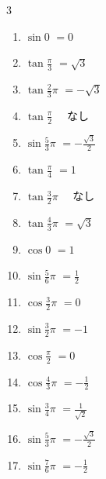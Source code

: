 \begin{multicols}{3}
\begin{enumerate}
  \item $\displaystyle \sin{0}$
        $\displaystyle =0$

  \item $\displaystyle \tan{\frac{\pi}{3}}$
        $\displaystyle =\sqrt{3}$

  \item $\displaystyle \tan{\frac{2}{3}\pi}$
        $\displaystyle =-\sqrt{3}$

  \item $\displaystyle \tan{\frac{\pi}{2}}$
        $\displaystyle \quad なし$

  \item $\displaystyle \sin{\frac{5}{3}\pi}$
        $\displaystyle =-\frac{\sqrt{3}}{2}$

  \item $\displaystyle \tan{\frac{\pi}{4}}$
        $\displaystyle =1$

  \item $\displaystyle \tan{\frac{3}{2}\pi}$
        $\displaystyle \quad なし$

  \item $\displaystyle \tan{\frac{4}{3}\pi}$
        $\displaystyle =\sqrt{3}$

  \item $\displaystyle \cos{0}$
        $\displaystyle =1$

  \item $\displaystyle \sin{\frac{5}{6}\pi}$
        $\displaystyle =\frac{1}{2}$

  \item $\displaystyle \cos{\frac{3}{2}\pi}$
        $\displaystyle =0$

  \item $\displaystyle \sin{\frac{3}{2}\pi}$
        $\displaystyle =-1$

  \item $\displaystyle \cos{\frac{\pi}{2}}$
        $\displaystyle =0$

  \item $\displaystyle \cos{\frac{4}{3}\pi}$
        $\displaystyle =-\frac{1}{2}$

  \item $\displaystyle \sin{\frac{3}{4}\pi}$
        $\displaystyle =\frac{1}{\sqrt{2}}$

  \item $\displaystyle \sin{\frac{5}{3}\pi}$
        $\displaystyle =-\frac{\sqrt{3}}{2}$

  \item $\displaystyle \sin{\frac{7}{6}\pi}$
        $\displaystyle =-\frac{1}{2}$


\end{enumerate}
\end{multicols}
